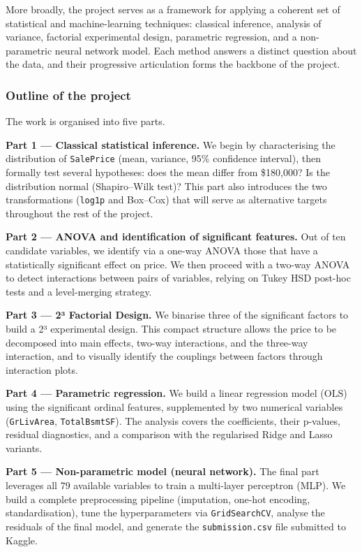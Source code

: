 More broadly, the project serves as a framework for applying a coherent
set of statistical and machine-learning techniques: classical inference,
analysis of variance, factorial experimental design, parametric
regression, and a non-parametric neural network model. Each method
answers a distinct question about the data, and their progressive
articulation forms the backbone of the project.

\subsubsection{Outline of the project}\label{outline-of-the-project}

The work is organised into five parts.

\textbf{Part 1 --- Classical statistical inference.} We begin by
characterising the distribution of \texttt{SalePrice} (mean, variance,
95\% confidence interval), then formally test several hypotheses: does
the mean differ from \$180,000? Is the distribution normal
(Shapiro--Wilk test)? This part also introduces the two transformations
(\texttt{log1p} and Box--Cox) that will serve as alternative targets
throughout the rest of the project.

\textbf{Part 2 --- ANOVA and identification of significant features.}
Out of ten candidate variables, we identify via a one-way ANOVA those
that have a statistically significant effect on price. We then proceed
with a two-way ANOVA to detect interactions between pairs of variables,
relying on Tukey HSD post-hoc tests and a level-merging strategy.

\textbf{Part 3 --- 2³ Factorial Design.} We binarise three of the
significant factors to build a 2³ experimental design. This compact
structure allows the price to be decomposed into main effects, two-way
interactions, and the three-way interaction, and to visually identify
the couplings between factors through interaction plots.

\textbf{Part 4 --- Parametric regression.} We build a linear regression
model (OLS) using the significant ordinal features, supplemented by two
numerical variables (\texttt{GrLivArea}, \texttt{TotalBsmtSF}). The
analysis covers the coefficients, their p-values, residual diagnostics,
and a comparison with the regularised Ridge and Lasso variants.

\textbf{Part 5 --- Non-parametric model (neural network).} The final
part leverages all 79 available variables to train a multi-layer
perceptron (MLP). We build a complete preprocessing pipeline
(imputation, one-hot encoding, standardisation), tune the
hyperparameters via \texttt{GridSearchCV}, analyse the residuals of the
final model, and generate the \texttt{submission.csv} file submitted to
Kaggle.

